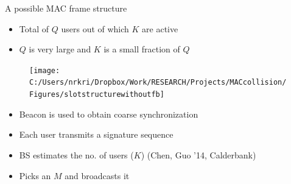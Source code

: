 \begin{frame}{A possible MAC frame structure}
\begin{itemize}
\item Total of $Q$ users out of which $K$ are active
\item $Q$ is very large and $K$ is a small fraction of $Q$
\end{itemize}
\begin{figure}[t!]
  \begin{center}
\begin{center}
\texttt{[image: C:/Users/nrkri/Dropbox/Work/RESEARCH/Projects/MACcollision/Figures/slotstructurewithoutfb]}
\end{center}
  \end{center}
\end{figure}
\begin{itemize}
\item Beacon is used to obtain coarse synchronization
\item Each user transmits a signature sequence
\item BS estimates the no. of users ($K$) (Chen, Guo '14, Calderbank)
\item Picks an $M$ and broadcasts it
\end{itemize}
\end{frame}


